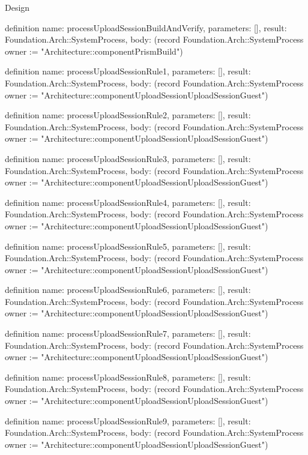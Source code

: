 \begin{lexlean}{Design}
\begin{semanticmodule}
definition{
  name: processUploadSessionBuildAndVerify,
  parameters: [],
  result: Foundation.Arch::SystemProcess,
  body: (record Foundation.Arch::SystemProcess {owner := "Architecture::componentPrismBuild"})
}

definition{
  name: processUploadSessionRule1,
  parameters: [],
  result: Foundation.Arch::SystemProcess,
  body: (record Foundation.Arch::SystemProcess {owner := "Architecture::componentUploadSessionUploadSessionGuest"})
}

definition{
  name: processUploadSessionRule2,
  parameters: [],
  result: Foundation.Arch::SystemProcess,
  body: (record Foundation.Arch::SystemProcess {owner := "Architecture::componentUploadSessionUploadSessionGuest"})
}

definition{
  name: processUploadSessionRule3,
  parameters: [],
  result: Foundation.Arch::SystemProcess,
  body: (record Foundation.Arch::SystemProcess {owner := "Architecture::componentUploadSessionUploadSessionGuest"})
}

definition{
  name: processUploadSessionRule4,
  parameters: [],
  result: Foundation.Arch::SystemProcess,
  body: (record Foundation.Arch::SystemProcess {owner := "Architecture::componentUploadSessionUploadSessionGuest"})
}

definition{
  name: processUploadSessionRule5,
  parameters: [],
  result: Foundation.Arch::SystemProcess,
  body: (record Foundation.Arch::SystemProcess {owner := "Architecture::componentUploadSessionUploadSessionGuest"})
}

definition{
  name: processUploadSessionRule6,
  parameters: [],
  result: Foundation.Arch::SystemProcess,
  body: (record Foundation.Arch::SystemProcess {owner := "Architecture::componentUploadSessionUploadSessionGuest"})
}

definition{
  name: processUploadSessionRule7,
  parameters: [],
  result: Foundation.Arch::SystemProcess,
  body: (record Foundation.Arch::SystemProcess {owner := "Architecture::componentUploadSessionUploadSessionGuest"})
}

definition{
  name: processUploadSessionRule8,
  parameters: [],
  result: Foundation.Arch::SystemProcess,
  body: (record Foundation.Arch::SystemProcess {owner := "Architecture::componentUploadSessionUploadSessionGuest"})
}

definition{
  name: processUploadSessionRule9,
  parameters: [],
  result: Foundation.Arch::SystemProcess,
  body: (record Foundation.Arch::SystemProcess {owner := "Architecture::componentUploadSessionUploadSessionGuest"})
}


\end{semanticmodule}
\end{lexlean}
